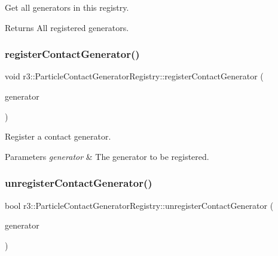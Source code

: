 Get all generators in this registry. 

\begin{DoxyReturn}{Returns}
All registered generators. 
\end{DoxyReturn}
\mbox{\label{classr3_1_1_particle_contact_generator_registry_a34d44783a363a513217dec694f625687}} 
\subsubsection{\texorpdfstring{register\+Contact\+Generator()}{registerContactGenerator()}}
{\footnotesize\ttfamily void r3\+::\+Particle\+Contact\+Generator\+Registry\+::register\+Contact\+Generator (\begin{DoxyParamCaption}\item[{\mbox{\hyperlink{classr3_1_1_particle_contact_generator}{Particle\+Contact\+Generator}} $\ast$}]{generator }\end{DoxyParamCaption})}



Register a contact generator. 


\begin{DoxyParams}{Parameters}
{\em generator} & The generator to be registered. \\
\hline
\end{DoxyParams}
\mbox{\label{classr3_1_1_particle_contact_generator_registry_ae8de6dd84335777644f7eac93b82ba1e}} 
\subsubsection{\texorpdfstring{unregister\+Contact\+Generator()}{unregisterContactGenerator()}}
{\footnotesize\ttfamily bool r3\+::\+Particle\+Contact\+Generator\+Registry\+::unregister\+Contact\+Generator (\begin{DoxyParamCaption}\item[{\mbox{\hyperlink{classr3_1_1_particle_contact_generator}{Particle\+Contact\+Generator}} $\ast$}]{generator }\end{DoxyParamCaption})}




